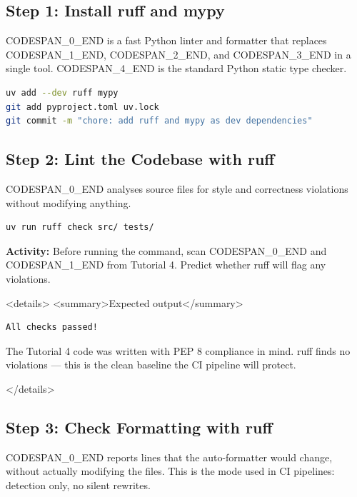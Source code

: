 \documentclass[11pt,a4paper]{book}
\begin{document}
\subsection{Step 1: Install ruff and mypy}

CODESPAN\_0\_END is a fast Python linter and formatter that replaces CODESPAN\_1\_END, CODESPAN\_2\_END, and CODESPAN\_3\_END in a single tool. CODESPAN\_4\_END is the standard Python static type checker.

\begin{lstlisting}[language=Bash]
uv add --dev ruff mypy
git add pyproject.toml uv.lock
git commit -m "chore: add ruff and mypy as dev dependencies"
\end{lstlisting}

\medskip

\subsection{Step 2: Lint the Codebase with ruff}

CODESPAN\_0\_END analyses source files for style and correctness violations without modifying anything.

\begin{lstlisting}[language=Bash]
uv run ruff check src/ tests/
\end{lstlisting}

\textbf{Activity:} Before running the command, scan CODESPAN\_0\_END and CODESPAN\_1\_END from Tutorial 4. Predict whether ruff will flag any violations.

<details>
<summary>Expected output</summary>

\begin{lstlisting}
All checks passed!
\end{lstlisting}

The Tutorial 4 code was written with PEP 8 compliance in mind. ruff finds no violations --- this is the clean baseline the CI pipeline will protect.

</details>

\medskip

\subsection{Step 3: Check Formatting with ruff}

CODESPAN\_0\_END reports lines that the auto-formatter would change, without actually modifying the files. This is the mode used in CI pipelines: detection only, no silent rewrites.
\end{document}
